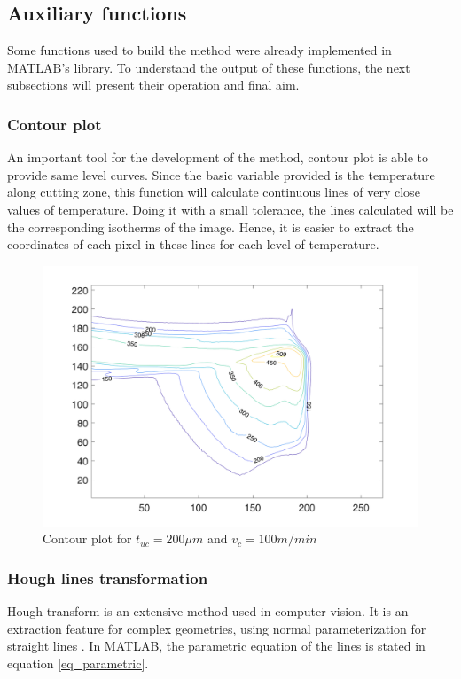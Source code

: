 	\subsection{Auxiliary functions}

		Some functions used to build the method were already implemented in MATLAB's library. To understand the output of these functions, the next subsections will present their operation and final aim.

		\subsubsection{Contour plot}
		\label{ch:seccontour}
			An important tool for the development of the method, contour plot is able to provide same level curves. Since the basic variable provided is the temperature along cutting zone, this function will calculate continuous lines of very close values of temperature. Doing it with a small tolerance, the lines calculated will be the corresponding isotherms of the image. Hence, it is easier to extract the coordinates of each pixel in these lines for each level of temperature.

			\begin{figure}[H]
				\centering
				\captionsetup{justification=centering}
				\includegraphics[scale=0.6]{Cap4/contour.png}
				\caption{Contour plot for $t_{uc} = 200\mu m$ and $v_{c} = 100 m/min$}
				\label{fig:contour}
			\end{figure}

		\subsubsection{Hough lines transformation}
		\label{ch:sechough}
			Hough transform is an extensive method used in computer vision. It is an extraction feature for complex geometries, using normal parameterization for straight lines \cite{duda1972use}. In MATLAB, the parametric equation of the lines is stated in equation \ref{eq_parametric}.

